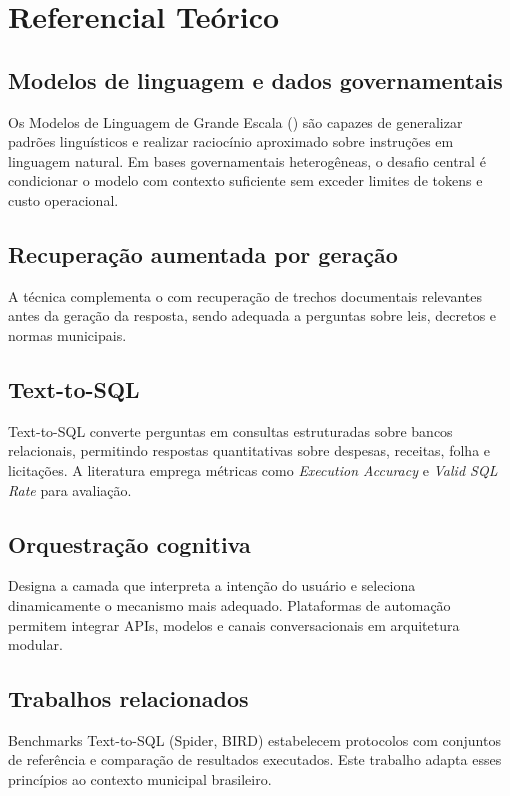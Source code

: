 \chapter{Referencial Teórico}

\section{Modelos de linguagem e dados governamentais}

Os Modelos de Linguagem de Grande Escala () são capazes de generalizar padrões linguísticos e realizar raciocínio aproximado sobre instruções em linguagem natural. Em bases governamentais heterogêneas, o desafio central é condicionar o modelo com contexto suficiente sem exceder limites de tokens e custo operacional.

\section{Recuperação aumentada por geração}

A técnica  complementa o  com recuperação de trechos documentais relevantes antes da geração da resposta, sendo adequada a perguntas sobre leis, decretos e normas municipais.

\section{Text-to-SQL}

Text-to-SQL converte perguntas em consultas estruturadas sobre bancos relacionais, permitindo respostas quantitativas sobre despesas, receitas, folha e licitações. A literatura emprega métricas como \textit{Execution Accuracy} e \textit{Valid SQL Rate} para avaliação.

\section{Orquestração cognitiva}

Designa a camada que interpreta a intenção do usuário e seleciona dinamicamente o mecanismo mais adequado. Plataformas de automação permitem integrar APIs, modelos e canais conversacionais em arquitetura modular.

\section{Trabalhos relacionados}

Benchmarks Text-to-SQL (Spider, BIRD) estabelecem protocolos com conjuntos de referência e comparação de resultados executados. Este trabalho adapta esses princípios ao contexto municipal brasileiro.
